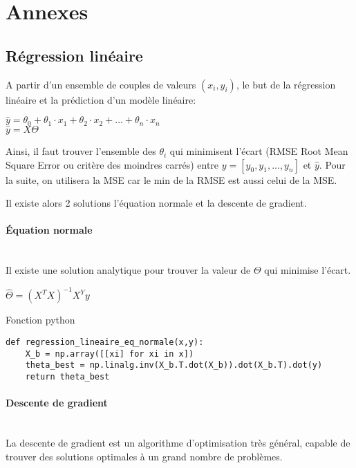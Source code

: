 \section{Annexes}

\subsection{Régression linéaire}

A partir d'un ensemble de couples de valeurs $(x_i,y_i)$, le but de la régression linéaire et la prédiction d'un modèle linéaire: \\
\begin{center}
$\hat{y}=\theta_0+\theta_1\cdot x_1+\theta_2\cdot x_2+...+\theta_n\cdot x_n$ \\
$\hat{y}=X \Theta$
\end{center}

Ainsi, il faut trouver l'ensemble des $\theta_i$ qui minimisent l'écart (RMSE Root Mean Square Error ou critère des moindres carrés) entre $y=[y_0, y_1,...,y_n]$ et $\hat{y}$. Pour la suite, on utilisera la MSE car le min de la RMSE est aussi celui de la MSE.

Il existe alors 2 solutions l'équation normale et la descente de gradient.

\paragraph{Équation normale} ~\ \\

Il existe une solution analytique pour trouver la valeur de $\Theta$ qui minimise l'écart.
\begin{center}
$\hat{\Theta}=(X^TX)^{-1}X^Yy$
\end{center}

Fonction python
\begin{lstlisting}
def regression_lineaire_eq_normale(x,y):
    X_b = np.array([[xi] for xi in x])
    theta_best = np.linalg.inv(X_b.T.dot(X_b)).dot(X_b.T).dot(y)
    return theta_best
\end{lstlisting}

\paragraph{Descente de gradient} ~\ \\

La descente de gradient est un algorithme d'optimisation très général, capable de trouver des solutions optimales à un grand nombre de problèmes. 

